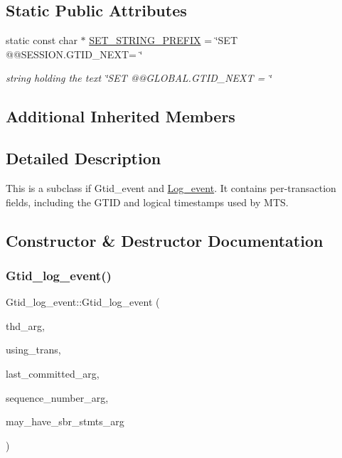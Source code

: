 \subsection*{Static Public Attributes}
\begin{DoxyCompactItemize}
\item 
\mbox{\label{classGtid__log__event_a9e32625b6dc8b312f6de7d59b78a1c23}} 
static const char $\ast$ \mbox{\hyperlink{classGtid__log__event_a9e32625b6dc8b312f6de7d59b78a1c23}{S\+E\+T\+\_\+\+S\+T\+R\+I\+N\+G\+\_\+\+P\+R\+E\+F\+IX}} = \char`\"{}S\+ET @@S\+E\+S\+S\+I\+O\+N.\+G\+T\+I\+D\+\_\+\+N\+E\+XT= \textquotesingle{}\char`\"{}
\begin{DoxyCompactList}\small\item\em string holding the text \char`\"{}\+S\+E\+T @@\+G\+L\+O\+B\+A\+L.\+G\+T\+I\+D\+\_\+\+N\+E\+X\+T = \textquotesingle{}\char`\"{} \end{DoxyCompactList}\end{DoxyCompactItemize}
\subsection*{Additional Inherited Members}


\subsection{Detailed Description}
This is a subclass if Gtid\+\_\+event and \mbox{\hyperlink{classLog__event}{Log\+\_\+event}}. It contains per-\/transaction fields, including the G\+T\+ID and logical timestamps used by M\+TS. 

\subsection{Constructor \& Destructor Documentation}
\mbox{\label{classGtid__log__event_af44a16a9c57f246d7b24ceae5fd6e12d}} 
\subsubsection{\texorpdfstring{Gtid\+\_\+log\+\_\+event()}{Gtid\_log\_event()}\hspace{0.1cm}{\footnotesize\ttfamily [1/2]}}
{\footnotesize\ttfamily Gtid\+\_\+log\+\_\+event\+::\+Gtid\+\_\+log\+\_\+event (\begin{DoxyParamCaption}\item[{T\+HD $\ast$}]{thd\+\_\+arg,  }\item[{bool}]{using\+\_\+trans,  }\item[{int64}]{last\+\_\+committed\+\_\+arg,  }\item[{int64}]{sequence\+\_\+number\+\_\+arg,  }\item[{bool}]{may\+\_\+have\+\_\+sbr\+\_\+stmts\+\_\+arg }\end{DoxyParamCaption})}

